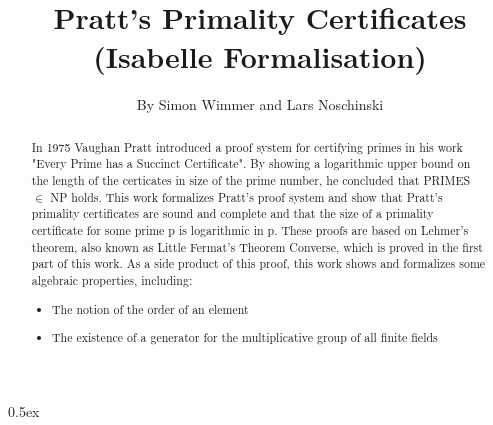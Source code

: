 \documentclass[11pt,a4paper]{article}
\begin{document}
\title{Pratt's Primality Certificates \\ (Isabelle Formalisation)}
\author{By Simon Wimmer and Lars Noschinski}
\maketitle

\begin{abstract}
In 1975 Vaughan Pratt introduced a proof system for certifying primes in his work
  "Every Prime has a Succinct Certiﬁcate"\cite{pratt1975certificate}.
  By showing a logarithmic upper bound on the length of the certicates in size of the prime number,
  he concluded that PRIMES $\in$ NP holds.
  This work formalizes Pratt's proof system and show that Pratt's primality certificates are sound
  and complete and that the size of a primality certificate for some prime p is logarithmic in p.
  These proofs are based on Lehmer's theorem, also known as Little Fermat's Theorem Converse,
  which is proved in the first part of this work.
  As a side product of this proof, this work shows and formalizes some algebraic properties,
  including:
  \begin {itemize}
  \item The notion of the order of an element
  \item The existence of a generator for the multiplicative group of all finite fields
  \end {itemize}
\end{abstract}

\tableofcontents

\parindent 0pt\parskip 0.5ex



\nocite{*}



\end{document}
